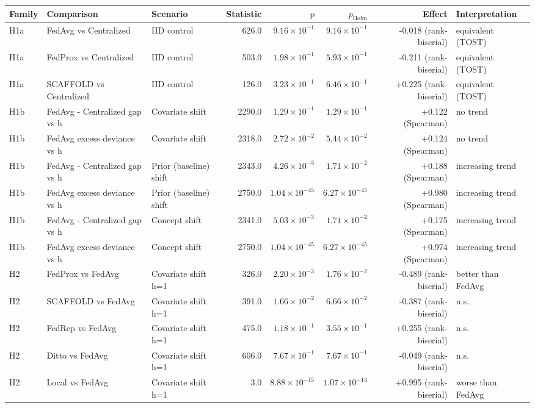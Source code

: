 \begin{tabular}{lllrrrrl}
\toprule
Family & Comparison & Scenario & Statistic & $p$ & $p_{\mathrm{Holm}}$ & Effect & Interpretation \\
\midrule
H1a & FedAvg vs Centralized & IID control & 626.0 & $9.16\times10^{-1}$ & $9.16\times10^{-1}$ & -0.018 (rank-biserial) & equivalent (TOST) \\
H1a & FedProx vs Centralized & IID control & 503.0 & $1.98\times10^{-1}$ & $5.93\times10^{-1}$ & -0.211 (rank-biserial) & equivalent (TOST) \\
H1a & SCAFFOLD vs Centralized & IID control & 126.0 & $3.23\times10^{-1}$ & $6.46\times10^{-1}$ & +0.225 (rank-biserial) & equivalent (TOST) \\
H1b & FedAvg - Centralized gap vs h & Covariate shift & 2290.0 & $1.29\times10^{-1}$ & $1.29\times10^{-1}$ & +0.122 (Spearman) & no trend \\
H1b & FedAvg excess deviance vs h & Covariate shift & 2318.0 & $2.72\times10^{-2}$ & $5.44\times10^{-2}$ & +0.124 (Spearman) & no trend \\
H1b & FedAvg - Centralized gap vs h & Prior (baseline) shift & 2343.0 & $4.26\times10^{-3}$ & $1.71\times10^{-2}$ & +0.188 (Spearman) & increasing trend \\
H1b & FedAvg excess deviance vs h & Prior (baseline) shift & 2750.0 & $1.04\times10^{-45}$ & $6.27\times10^{-45}$ & +0.980 (Spearman) & increasing trend \\
H1b & FedAvg - Centralized gap vs h & Concept shift & 2341.0 & $5.03\times10^{-3}$ & $1.71\times10^{-2}$ & +0.175 (Spearman) & increasing trend \\
H1b & FedAvg excess deviance vs h & Concept shift & 2750.0 & $1.04\times10^{-45}$ & $6.27\times10^{-45}$ & +0.974 (Spearman) & increasing trend \\
H2 & FedProx vs FedAvg & Covariate shift h=1 & 326.0 & $2.20\times10^{-3}$ & $1.76\times10^{-2}$ & -0.489 (rank-biserial) & better than FedAvg \\
H2 & SCAFFOLD vs FedAvg & Covariate shift h=1 & 391.0 & $1.66\times10^{-2}$ & $6.66\times10^{-2}$ & -0.387 (rank-biserial) & n.s. \\
H2 & FedRep vs FedAvg & Covariate shift h=1 & 475.0 & $1.18\times10^{-1}$ & $3.55\times10^{-1}$ & +0.255 (rank-biserial) & n.s. \\
H2 & Ditto vs FedAvg & Covariate shift h=1 & 606.0 & $7.67\times10^{-1}$ & $7.67\times10^{-1}$ & -0.049 (rank-biserial) & n.s. \\
H2 & Local vs FedAvg & Covariate shift h=1 & 3.0 & $8.88\times10^{-15}$ & $1.07\times10^{-13}$ & +0.995 (rank-biserial) & worse than FedAvg \\

\end{tabular}
